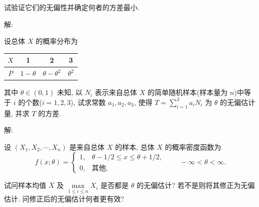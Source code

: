 \documentclass[standard]{ExBook}
\begin{document}
\begin{qitems}
\begin{bbox}
\begin{shaded}
试验证它们的无偏性并确定何者的方差最小.
    \end{shaded}
    \end{bbox}

\vspace{-5em}

    \begin{bbox}
解: 
    \end{bbox}

\vspace{-5em}

    \begin{bbox}
    \begin{shaded}
        \qitem
设总体 \( X \) 的概率分布为

\begin{center}
\setlength{\tabcolsep}{51pt}
\begin{tabular}{c|ccc}
\hline
\( X \) & 1 & 2 & 3 \\
\hline
\( P \) & \( 1 - \theta \) & \( \theta - \theta^2 \) & \( \theta^2 \) \\
\hline
\end{tabular}
\end{center}

其中 \( \theta \in (0, 1) \) 未知, 以 \( N_i \) 表示来自总体 \( X \) 的简单随机样本(样本量为 \( n \))中等于 \( i \) 的个数(\( i = 1, 2, 3 \)), 试求常数 \( a_1, a_2, a_3 \), 使得 \( T = \displaystyle\sum\limits_{i=1}^{3} a_i N_i \) 为 \( \theta \) 的无偏估计量, 并求 \( T \) 的方差.
    \end{shaded}
    \end{bbox}

\vspace{-5em}

    \begin{bbox}
解: 
    \end{bbox}

\vspace{-5em}

    \begin{bbox}
    \begin{shaded}
        \qitem
设 \((X_1, X_2, \cdots, X_n)\) 是来自总体 \(X\) 的样本, 总体 \(X\) 的概率密度函数为  
\[f(x; \theta) = 
\begin{cases} 
1, & \theta - 1/2 \leq x \leq \theta + 1/2, \\ 
0, & \text{其他}, 
\end{cases}
\qquad
- \infty < \theta < \infty.\]

试问样本均值 \(\overline{X}\) 及 \(\max\limits_{1 \leq i \leq n} X_i\) 是否都是 \(\theta\) 的无偏估计? 若不是则将其修正为无偏估计. 问修正后的无偏估计何者更有效?
    \end{shaded}
    \end{bbox}


\end{qitems}
\end{document}
